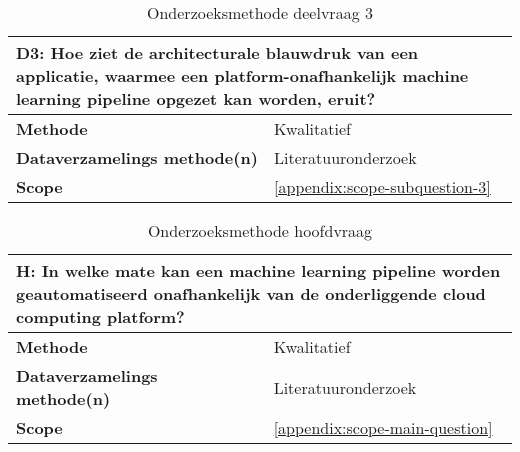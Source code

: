 \begin{table}[hbt!]
  \centering
  \begin{tabular}{|p{.215\linewidth}|p{.72\linewidth}|}
  \hline
  \multicolumn{2}{|p{.97\linewidth}|}{\textbf{D3: Hoe ziet de architecturale blauwdruk van een applicatie, waarmee een platform-onafhankelijk machine learning pipeline opgezet kan worden, eruit?}} \\ \hline
    \textbf{Methode}&
      Kwalitatief
    \\ \hline
    \textbf{Dataverzamelings methode(n)}&
      Literatuuronderzoek
    \\ \hline
    \textbf{Scope}&
      \autoref{appendix:scope-subquestion-3}
    \\ \hline
  \end{tabular}
  \caption{Onderzoeksmethode deelvraag 3}
  \label{table:sq3}
\end{table}

\space
\newpage

\begin{table}[hbt!]
  \centering
  \begin{tabular}{|p{.215\linewidth}|p{.72\linewidth}|}
  \hline
  \multicolumn{2}{|p{.97\linewidth}|}{\textbf{H: In welke mate kan een machine learning pipeline worden geautomatiseerd onafhankelijk van de onderliggende cloud computing platform?}} \\ \hline
    \textbf{Methode}&
      Kwalitatief
    \\ \hline
    \textbf{Dataverzamelings methode(n)}&
      Literatuuronderzoek
    \\ \hline
    \textbf{Scope}&
      \autoref{appendix:scope-main-question}
    \\ \hline
  \end{tabular}
  \caption{Onderzoeksmethode hoofdvraag}
  \label{table:mq}
\end{table}